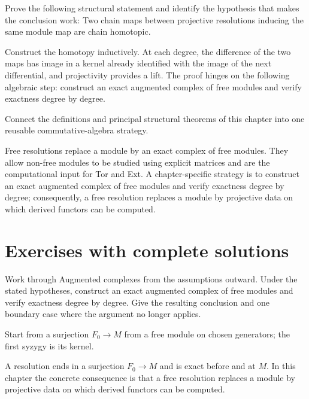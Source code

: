 \begin{problem}\label{prob:v23-problem-11}
Prove the following structural statement and identify the hypothesis that makes the conclusion work: Two chain maps between projective resolutions inducing the same module map are chain homotopic.
\end{problem}
\begin{solution}
Construct the homotopy inductively. At each degree, the difference of the two maps has image in a kernel already identified with the image of the next differential, and projectivity provides a lift. The proof hinges on the following algebraic step: construct an exact augmented complex of free modules and verify exactness degree by degree.
\end{solution}

\begin{problem}\label{prob:v23-problem-12}
Connect the definitions and principal structural theorems of this chapter into one reusable commutative-algebra strategy.
\end{problem}
\begin{solution}
Free resolutions replace a module by an exact complex of free modules. They allow non-free modules to be studied using explicit matrices and are the computational input for Tor and Ext. A chapter-specific strategy is to construct an exact augmented complex of free modules and verify exactness degree by degree; consequently, a free resolution replaces a module by projective data on which derived functors can be computed.
\end{solution}

\section{Exercises with complete solutions}

\begin{exercise}\label{exr:v23-01}
Work through Augmented complexes from the assumptions outward. Under the stated hypotheses, construct an exact augmented complex of free modules and verify exactness degree by degree. Give the resulting conclusion and one boundary case where the argument no longer applies.
\end{exercise}
\begin{hint}
Start from a surjection \(F_0\to M\) from a free module on chosen generators; the first syzygy is its kernel.
\end{hint}
\begin{solution}
A resolution ends in a surjection $F_0\to M$ and is exact before and at $M$. In this chapter the concrete consequence is that a free resolution replaces a module by projective data on which derived functors can be computed.
\end{solution}

